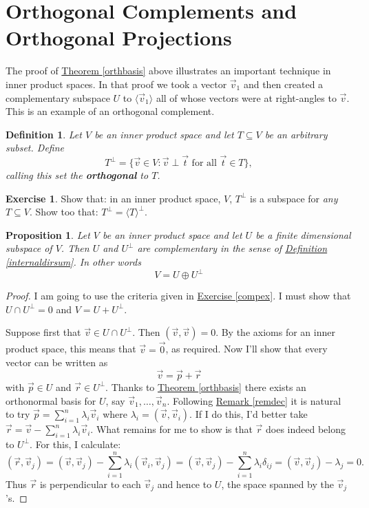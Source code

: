 \documentclass[11pt]{amsbook}
\newtheorem{definition}[theorem]{Definition}
\newtheorem{proposition}[theorem]{Proposition}
\theoremstyle{definition}
\newtheorem{exercise}{Exercise}
\begin{document}
\section{Orthogonal Complements and Orthogonal Projections}
The proof of \hyperref[orthbasis]{Theorem \ref{orthbasis}} above illustrates an important technique in inner product spaces. In that proof we took a vector $\vec{v}_1$ and then created a complementary subspace $U$ to $\langle \vec{v}_1 \rangle$ all of whose vectors were at right-angles to $\vec{v}$. This is an example of an orthogonal complement.

\begin{definition} Let $V$ be an inner product space and let $T\subseteq V$ be an arbitrary subset. Define $$T^{\perp} = \{ \vec{v}\in V: \vec{v}\perp \vec{t} \text{ for all } \vec{t}\in T\},$$ calling this set the {\bf orthogonal} to $T$.
\end{definition}

\begin{exercise} Show that: in an inner product space, $V$, $T^{\perp}$ is a subspace for {\it any} $T\subseteq V$. Show too that: $T^{\perp} = \langle T \rangle ^{\perp}.$ \end{exercise}

\begin{proposition} \label{hypcom} Let $V$ be an inner product space and let $U$ be a finite dimensional subspace of $V$. Then $U$ and $U^{\perp}$ are complementary in the sense of \hyperref[internaldirsum]{Definition \ref{internaldirsum}}. In other words $$V = U \oplus U^{\perp}$$
\end{proposition}

\begin{proof}
I am going to use the criteria given in \hyperref[compex]{Exercise \ref{compex}}. I must show that $U \cap U^{\perp} = 0$ and $V = U + U^{\perp}$.

Suppose first that $\vec{v}\in U \cap U^{\perp}$. Then $(\vec{v}, \vec{v}) = 0$. By the axioms for an inner product space, this means that $\vec{v} = \vec{0}$, as required.
Now I'll show that every vector can be written as $$\vec{v} = \vec{p} + \vec{r}$$ with $\vec{p}\in U$ and $\vec{r}\in U^{\perp}$. Thanks to \hyperref[orthbasis]{Theorem \ref{orthbasis}} there exists an orthonormal basis for $U$, say $\vec{v}_1, \ldots , \vec{v}_n$. Following \hyperref[remdec]{Remark \ref{remdec}} it is natural to try $\vec{p} = \sum_{i=1}^n \lambda_i \vec{v}_i$ where $\lambda_i = (\vec{v}, \vec{v}_i)$. If I do this, I'd better take $\vec{r} = \vec{v} - \sum_{i=1}^n \lambda_i \vec{v}_i$. What remains for me to show is that $\vec{r}$ does indeed belong to $U^{\perp}$. For this, I calculate:
$$(\vec{r}, \vec{v}_j) = ( \vec{v}, \vec{v}_j)  - \sum_{i=1}^n \lambda_i (\vec{v}_i, \vec{v}_j) = ( \vec{v}, \vec{v}_j)  - \sum_{i=1}^n \lambda_i \delta_{ij} = ( \vec{v}, \vec{v}_j)  -  \lambda_j = 0.$$ Thus $\vec{r}$ is perpendicular to each $\vec{v}_j$ and hence to $U$, the space spanned by the $\vec{v}_j$'s.
\end{proof}
\end{document}

